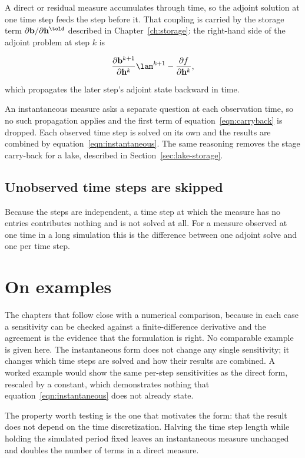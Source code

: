 A direct or residual measure accumulates through time, so the adjoint solution
at one time step feeds the step before it. That coupling is carried by the
storage term $\partial \mathbf{b} / \partial \mathbf{h}^{\told}$ described in
Chapter~\ref{ch:storage}: the right-hand side of the adjoint problem at step $k$
is

\begin{equation}
	\label{eqn:carryback}
	\frac{\partial \mathbf{b}^{k+1}}{\partial \mathbf{h}^{k}} \lam^{k+1}
	- \frac{\partial f}{\partial \mathbf{h}^{k}},
\end{equation}

\noindent which propagates the later step's adjoint state backward in time.

An instantaneous measure asks a separate question at each observation time, so
no such propagation applies and the first term of equation~\ref{eqn:carryback}
is dropped. Each observed time step is solved on its own and the results are
combined by equation~\ref{eqn:instantaneous}. The same reasoning removes the
stage carry-back for a lake, described in Section~\ref{sec:lake-storage}.

\subsection{Unobserved time steps are skipped}

Because the steps are independent, a time step at which the measure has no
entries contributes nothing and is not solved at all. For a measure observed at
one time in a long simulation this is the difference between one adjoint solve
and one per time step.

\section{On examples}

The chapters that follow close with a numerical comparison, because in each case
a sensitivity can be checked against a finite-difference derivative and the
agreement is the evidence that the formulation is right. No comparable example
is given here. The instantaneous form does not change any single sensitivity; it
changes which time steps are solved and how their results are combined. A
worked example would show the same per-step sensitivities as the direct form,
rescaled by a constant, which demonstrates nothing that
equation~\ref{eqn:instantaneous} does not already state.

The property worth testing is the one that motivates the form: that the result
does not depend on the time discretization. Halving the time step length while
holding the simulated period fixed leaves an instantaneous measure unchanged and
doubles the number of terms in a direct measure.
